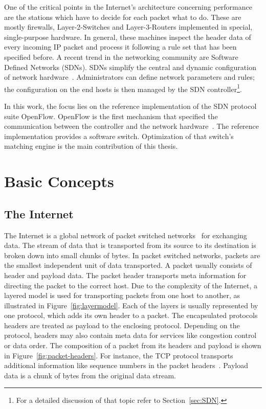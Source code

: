\documentclass[a4paper,
		12pt,
		parskip=full,
		titlepage
		]{scrartcl}
\begin{document}
One of the critical points in the Internet's architecture concerning performance 
are the stations which have to decide for each packet what to do.
These are mostly firewalls, Layer-2-Switches and Layer-3-Routers implemented in special, single-purpose hardware.
In general, these machines inspect the header data of every incoming IP packet and process it 
following a rule set that has been specified before.
A recent trend in the networking community are Software Defined Networks (SDNs).
SDNs simplify the central and dynamic configuration of network hardware~\cite{onf_whitepaper}.
Administrators can define network parameters and rules; the configuration 
on the end hosts is then managed by the SDN controller\footnote{For a detailed discussion of that topic refer to Section~\ref{sec:SDN}.}.

In this work, the focus lies on the reference implementation of the SDN protocol suite OpenFlow.
OpenFlow is the first mechanism that specified the communication between the controller and the network hardware~\cite{onf_whitepaper}.
The reference implementation provides a software switch.
Optimization of that switch's matching engine is the main contribution of this thesis.

\section{Basic Concepts}
\subsection{The Internet}
The Internet is a global network of packet switched networks~\cite[Chapter 1.1]{kurose_ross} for exchanging data. 
The stream of data that is transported from its source to its destination is broken down into small chunks of bytes.
In packet switched networks, packets are the smallest independent unit of data transported.
A packet usually consists of header and payload data.
The packet header transports meta information for directing the packet to the correct host.
Due to the complexity of the Internet, a layered model is used for transporting 
packets from one host to another, as illustrated in Figure~\ref{fig:layermodel}.
Each of the layers is usually represented by one protocol, which adds its own header to a packet.
The encapsulated protocols headers are treated as payload to the enclosing protocol.
Depending on the protocol, headers may also contain meta data for services like congestion control or data order.
The composition of a packet from its headers and payload is shown in Figure~\ref{fig:packet-headers}.
For instance, the TCP protocol transports additional information like sequence numbers in the packet headers~\cite[Chapter 3.5]{kurose_ross}.
Payload data is a chunk of bytes from the original data stream.
\end{document}
